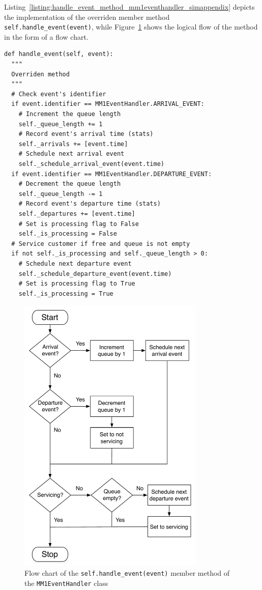 Listing~\ref{listing:handle_event_method_mm1eventhandler_simappendix} depicts the implementation of the overriden member method \lstinline{self.handle_event(event)}, while Figure~\ref{fig:mm1_handle_event_simappendix} shows the logical flow of the method in the form of a flow chart.

\begin{lstlisting}[caption=\lstinline{self.handle_event(event)} member method of the \lstinline{MM1EventHandler} class, label=listing:handle_event_method_mm1eventhandler_simappendix]
def handle_event(self, event):
  """
  Overriden method
  """
  # Check event's identifier
  if event.identifier == MM1EventHandler.ARRIVAL_EVENT:
    # Increment the queue length
    self._queue_length += 1
    # Record event's arrival time (stats)
    self._arrivals += [event.time]
    # Schedule next arrival event
    self._schedule_arrival_event(event.time)
  if event.identifier == MM1EventHandler.DEPARTURE_EVENT:
    # Decrement the queue length
    self._queue_length -= 1
    # Record event's departure time (stats)
    self._departures += [event.time]
    # Set is processing flag to False
    self._is_processing = False
  # Service customer if free and queue is not empty
  if not self._is_processing and self._queue_length > 0:
    # Schedule next departure event
    self._schedule_departure_event(event.time)
    # Set is processing flag to True
    self._is_processing = True
\end{lstlisting}

\begin{figure}
  \includegraphics[width=3.5in]{Appendices/Figures/mm1_handle_event}
  \caption{Flow chart of the \lstinline{self.handle_event(event)} member method of the \lstinline{MM1EventHandler} class}
  \label{fig:mm1_handle_event_simappendix}
\end{figure}

